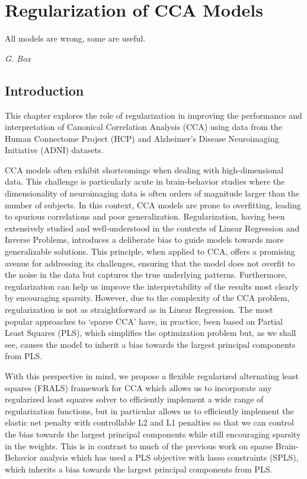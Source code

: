 \graphicspath{{chapters/regularization}}
\chapter{Regularization of CCA Models}\label{chap:als}
\epigraph{All models are wrong, some are useful.}{\textit{G. Box}}
\minitoc
\section{Introduction}\label{sec:introduction}

This chapter explores the role of regularization in improving the performance and interpretation of Canonical
Correlation Analysis (CCA) using data from the Human Connectome Project (HCP) and Alzheimer's Disease Neuroimaging Initiative (ADNI) datasets.

CCA models often exhibit shortcomings when dealing with high-dimensional data.
This challenge is particularly acute in brain-behavior studies where the dimensionality of neuroimaging data is often orders of magnitude larger than the number of subjects.
In this context, CCA models are prone to overfitting, leading to spurious correlations and poor generalization.
Regularization, having been extensively studied and well-understood in the contexts of Linear Regression and Inverse Problems, introduces a deliberate bias to guide models towards more generalizable solutions.
This principle, when applied to CCA, offers a promising avenue for addressing its challenges, ensuring that the model does not overfit to the noise in the data but captures the true underlying patterns.
Furthermore, regularization can help us improve the interpretability of the results most clearly by encouraging sparsity.
However, due to the complexity of the CCA problem, regularization is not as straightforward as in Linear Regression.
The most popular approaches to `sparse CCA' have, in practice, been based on Partial Least Squares (PLS), which simplifies the optimization problem but, as we shall see, causes the model to inherit a bias towards the largest principal components from PLS.

With this perspective in mind, we propose a flexible regularized alternating least squares (FRALS) framework for CCA which allows us to incorporate any regularized least squares solver to efficiently implement a wide range of regularization functions, but in particular allows us to efficiently implement the elastic net penalty with controllable L2 and L1 penalties so that we can control the bias towards the largest principal components while still encouraging sparsity in the weights.
This is in contrast to much of the previous work on sparse Brain-Behavior analysis which has used a PLS objective with lasso constraints (SPLS), which inherits a bias towards the largest principal components from PLS.

